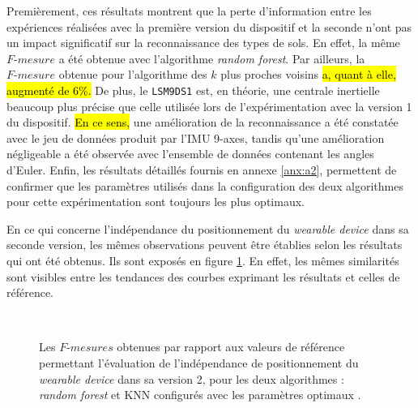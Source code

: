 Premièrement, ces résultats montrent que la perte d'information entre les expériences réalisées avec la première version du dispositif et la seconde n'ont pas un impact significatif sur la reconnaissance des types de sols. En effet, la même $F\mbox{-}mesure$ a été obtenue avec l'algorithme \textit{random forest}. Par ailleurs, la $F\mbox{-}mesure$ obtenue pour l'algorithme des $k$ plus proches voisins \hl{a, quant à elle, augmenté de 6\%.} De plus, le \texttt{LSM9DS1} est, en théorie, une centrale inertielle beaucoup plus précise que celle utilisée lors de l'expérimentation avec la version 1 du dispositif. \hl{En ce sens,} une amélioration de la reconnaissance a été constatée avec le jeu de données produit par l'\acs{IMU} 9-axes, tandis qu'une amélioration négligeable a été observée avec l'ensemble de données contenant les angles d'Euler. Enfin, les résultats détaillés fournis en annexe \ref{anx:a2}, permettent de confirmer que les paramètres utilisés dans la configuration des deux algorithmes pour cette expérimentation sont toujours les plus optimaux.

En ce qui concerne l'indépendance du positionnement du \textit{wearable device} dans sa seconde version, les mêmes observations peuvent être établies selon les résultats qui ont été obtenus. Ils sont exposés en figure \ref{fig:pos_ind_wear_v2}. En effet, les mêmes similarités sont visibles entre les tendances des courbes exprimant les résultats et celles de référence.

\begin{figure}[H]
    \centering
    \\[20pt]
    \caption[Les $F\mbox{-} mesures$ obtenues par rapport aux valeurs de référence permettant l'évaluation de l'indépendance de positionnement du \textit{wearable device} dans sa version 2, pour les deux algorithmes : \textit{random forest} et \acs{KNN} configurés avec les paramètres optimaux.]{Les $F\mbox{-} mesures$ obtenues par rapport aux valeurs de référence permettant l'évaluation de l'indépendance de positionnement du \textit{wearable device} dans sa version 2, pour les deux algorithmes : \textit{random forest} et \acs{KNN} configurés avec les paramètres optimaux \citep{Thullier2017}.}
    \label{fig:pos_ind_wear_v2}
\end{figure}

